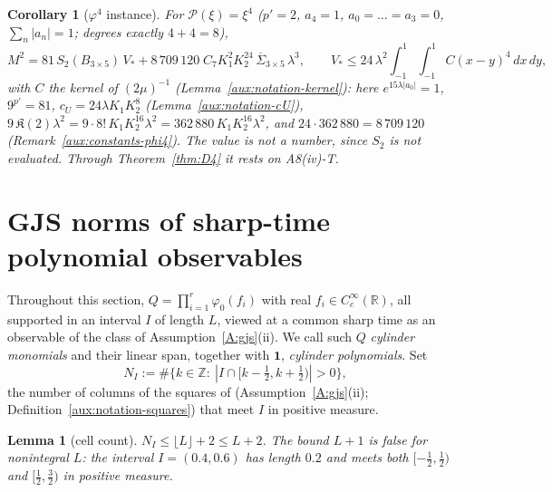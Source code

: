 \documentclass[11pt,a4paper]{article}
\theoremstyle{plain}
\newtheorem{lemma}[theorem]{Lemma}
\newtheorem{corollary}[theorem]{Corollary}
\theoremstyle{definition}
\theoremstyle{plain}
\theoremstyle{definition}
\newcommand{\R}{\mathbb{R}}
\newcommand{\Z}{\mathbb{Z}}
\begin{document}
\begin{corollary}[$\varphi^4$ instance]\label{cor:M2phi4}
For $\mathscr P(\xi)=\xi^4$ ($p'=2$, $a_4=1$, $a_0=\dots=a_3=0$, $\sum_n|a_n|=1$;
degrees exactly $4+4=8$),
\[
 M^2=81\,S_2(B_{3\times5})\,V_*+8\,709\,120\;C_7K_1^2K_2^{24}\,\overline\Sigma_{3\times5}\,\lambda^3,
 \qquad
 V_*\le24\,\lambda^2\int_{-1}^1\!\!\int_{-1}^1C(x-y)^4\,dx\,dy ,
\]
with $C$ the kernel of $(2\mu)^{-1}$ (Lemma~\ref{aux:notation-kernel}): here
$e^{15\lambda|a_0|}=1$, $9^{p'}=81$, $c_U=24\lambda K_1K_2^8$
(Lemma~\ref{aux:notation-cU}), $9\,\mathfrak K(2)\lambda^2=9\cdot8!\,K_1K_2^{16}\lambda^2=
362\,880\,K_1K_2^{16}\lambda^2$, and $24\cdot362\,880=8\,709\,120$
(Remark~\ref{aux:constants-phi4}).  The value is not a number, since $S_2$ is not evaluated.  Through Theorem~\ref{thm:D4} it
rests on A8(iv)-T.
\end{corollary}

\section{GJS norms of sharp-time polynomial observables}\label{sec:norms}

Throughout this section, $Q=\prod_{i=1}^r\varphi_0(f_i)$ with real $f_i\in C_c^\infty(\R)$,
all supported in an interval $I$ of length $L$, viewed at a common sharp time as an
observable of the class of Assumption~\ref{A:gjs}(ii). We call such $Q$ \emph{cylinder
monomials} and their linear span, together with $\mathbf 1$, \emph{cylinder polynomials}.
Set
\[
 N_I:=\#\{k\in\Z:\ |I\cap[k-\tfrac12,k+\tfrac12)|>0\} ,
\]
the number of columns of the squares of \cite[p.~593]{GJS} (Assumption~\ref{A:gjs}(ii);
Definition~\ref{aux:notation-squares}) that meet $I$ in positive measure.

\begin{lemma}[cell count]\label{lem:cells}
$N_I\le\lfloor L\rfloor+2\le L+2$. The bound $L+1$ is %
false for nonintegral $L$: the interval $I=(0.4,0.6)$ has length $0.2$ and meets both
$[-\frac12,\frac12)$ and $[\frac12,\frac32)$ in positive measure.
\end{lemma}
\end{document}
